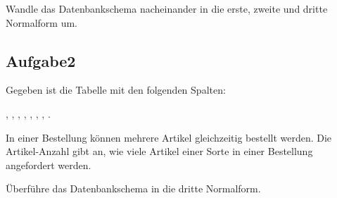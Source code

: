 Wandle das Datenbankschema nacheinander in die erste, zweite und dritte
Normalform um.


\subsection{Aufgabe2}

Gegeben ist die Tabelle  mit den folgenden Spalten:

, ,
, ,
, ,
, .

In einer Bestellung können mehrere Artikel gleichzeitig bestellt werden. Die
Artikel-Anzahl gibt an, wie viele Artikel einer Sorte in einer Bestellung
angefordert werden.

Überführe das Datenbankschema in die dritte Normalform.